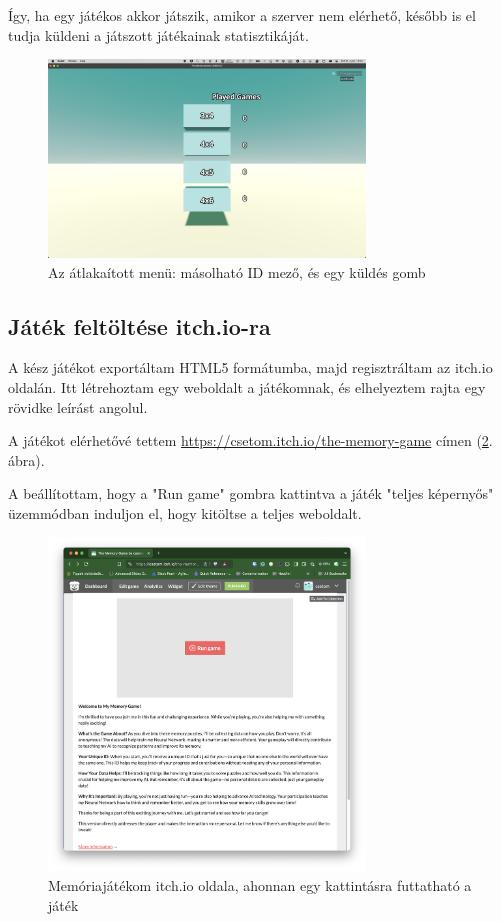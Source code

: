 Így, ha egy játékos akkor játszik, amikor a szerver nem elérhető, később is el tudja küldeni a játszott játékainak statisztikáját.\begin{figure}[h]
    \centering
    \includegraphics[width=0.75\textwidth]{img/menu_remake.png}
    \caption{Az átlakaított menü: másolható ID mező, és egy küldés gomb}
    \label{img:menu_remake}  
\end{figure}

\subsection{Játék feltöltése itch.io-ra}

A kész játékot exportáltam HTML5 formátumba, majd regisztráltam az itch.io oldalán.
Itt létrehoztam egy weboldalt a játékomnak, és elhelyeztem rajta egy rövidke leírást angolul.

A játékot elérhetővé tettem \url{https://csetom.itch.io/the-memory-game} címen (\ref{img:itch.io}. ábra). 

A beállítottam, hogy a "Run game" gombra kattintva a játék "teljes képernyős" üzemmódban induljon el, hogy kitöltse a teljes weboldalt. 

\begin{figure}[h]
  \centering
  \includegraphics[width=0.75\textwidth]{img/Itch.io.png}
  \caption{Memóriajátékom itch.io oldala, ahonnan egy kattintásra futtatható a játék}
  \label{img:itch.io}  
\end{figure}


